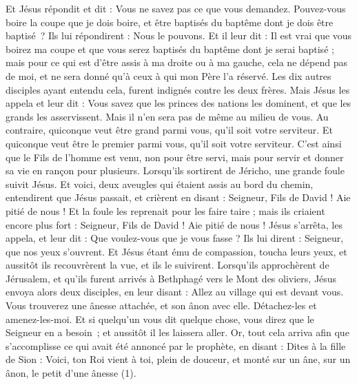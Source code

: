 \begin{multicols}{2}
{Et Jésus répondit et dit : Vous ne savez pas ce que vous demandez. Pouvez-vous boire la coupe que je dois boire, et être baptisés du baptême dont je dois être baptisé ? Ils lui répondirent : Nous le pouvons.
Et il leur dit : Il est vrai que vous boirez ma coupe et que vous serez baptisés du baptême dont je serai baptisé ; mais pour ce qui est d'être assis à ma droite ou à ma gauche, cela ne dépend pas de moi, et ne sera donné qu’à ceux à qui mon Père l’a réservé.
Les dix autres disciples ayant entendu cela, furent indignés contre les deux frères.
Mais Jésus les appela et leur dit : Vous savez que les princes des nations les dominent, et que les grands les asservissent.
Mais il n'en sera pas de même au milieu de vous. Au contraire, quiconque veut être grand parmi vous, qu'il soit votre serviteur.
Et quiconque veut être le premier parmi vous, qu'il soit votre serviteur.
C’est ainsi que le Fils de l'homme est venu, non pour être servi, mais pour servir et donner sa vie en rançon pour plusieurs.
Lorsqu’ils sortirent de Jéricho, une grande foule suivit Jésus.
Et voici, deux aveugles qui étaient assis au bord du chemin, entendirent que Jésus passait, et crièrent en disant : Seigneur, Fils de David ! Aie pitié de nous !
Et la foule les reprenait pour les faire taire ; mais ils criaient encore plus fort : Seigneur, Fils de David ! Aie pitié de nous !
Jésus s'arrêta, les appela, et leur dit : Que voulez-vous que je vous fasse ?
Ils lui dirent : Seigneur, que nos yeux s’ouvrent.
Et Jésus étant ému de compassion, toucha leurs yeux, et aussitôt ils recouvrèrent la vue, et ils le suivirent.
\VerseOne{}Lorsqu’ils approchèrent de Jérusalem, et qu'ils furent arrivés à Bethphagé vers le Mont des oliviers, Jésus envoya alors deux disciples,
en leur disant : Allez au village qui est devant vous. Vous trouverez une ânesse attachée, et son ânon avec elle. Détachez-les et amenez-les-moi.
Et si quelqu'un vous dit quelque chose, vous direz que le Seigneur en a besoin ; et aussitôt il les laissera aller.
Or, tout cela arriva afin que s’accomplisse ce qui avait été annoncé par le prophète, en disant :
Dites à la fille de Sion : Voici, ton Roi vient à toi, plein de douceur, et monté sur un âne, sur un ânon, le petit d'une ânesse (1).
}
\end{multicols}
